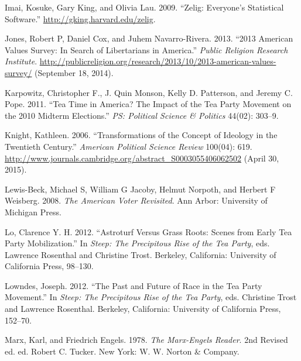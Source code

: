 \documentclass[12pt,]{article}
\begin{document}
Imai, Kosuke, Gary King, and Olivia Lau. 2009. ``Zelig: Everyone's
Statistical Software.'' \url{http://gking.harvard.edu/zelig}.

Jones, Robert P, Daniel Cox, and Juhem Navarro-Rivera. 2013. ``2013
American Values Survey: In Search of Libertarians in America.''
\emph{Public Religion Research Institute}.
\url{http://publicreligion.org/research/2013/10/2013-american-values-survey/}
(September 18, 2014).

Karpowitz, Christopher F., J. Quin Monson, Kelly D. Patterson, and
Jeremy C. Pope. 2011. ``Tea Time in America? The Impact of the Tea Party
Movement on the 2010 Midterm Elections.'' \emph{PS: Political Science \&
Politics} 44(02): 303--9.

Knight, Kathleen. 2006. ``Transformations of the Concept of Ideology in
the Twentieth Century.'' \emph{American Political Science Review}
100(04): 619.
\url{http://www.journals.cambridge.org/abstract_S0003055406062502}
(April 30, 2015).

Lewis-Beck, Michael S, William G Jacoby, Helmut Norpoth, and Herbert F
Weisberg. 2008. \emph{The American Voter Revisited}. Ann Arbor:
University of Michigan Press.

Lo, Clarence Y. H. 2012. ``Astroturf Versus Grass Roots: Scenes from
Early Tea Party Mobilization.'' In \emph{Steep: The Precipitous Rise of
the Tea Party}, eds. Lawrence Rosenthal and Christine Trost. Berkeley,
California: University of California Press, 98--130.

Lowndes, Joseph. 2012. ``The Past and Future of Race in the Tea Party
Movement.'' In \emph{Steep: The Precipitous Rise of the Tea Party}, eds.
Christine Trost and Lawrence Rosenthal. Berkeley, California: University
of California Press, 152--70.

Marx, Karl, and Friedrich Engels. 1978. \emph{The Marx-Engels Reader}.
2nd Revised ed. ed. Robert C. Tucker. New York: W. W. Norton \& Company.
\end{document}
